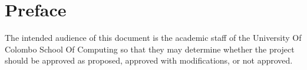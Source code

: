 \chapter*{Preface \centering}

{The intended audience of this document is the academic staff of the University Of Colombo School Of Computing so that they may determine whether the project should be approved as proposed, approved with modifications, or not approved.}